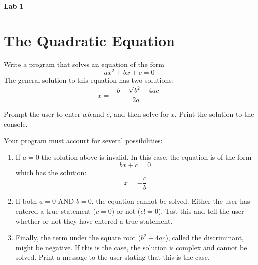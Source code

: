 \documentclass{article}
\begin{document}
\fancyfoot[C]{\thepage}
\vspace*{0cm}
\begin{center}
	{\LARGE \textbf{Lab 1}}\\
	\vspace{0.25cm}
\end{center}

\section{The Quadratic Equation}
Write a program that solves an equation of the form 
\begin{equation*}
ax^2+bx+c=0
\end{equation*}
The general solution to this equation has two solutions:
\begin{equation*}
x=\frac{-b\pm\sqrt{b^2-4ac}}{2a}
\end{equation*}

Prompt the user to enter $a$,$b$,and $c$, and then solve for $x$. Print the solution to the console.

Your program must account for several possibilities:
\begin{enumerate}
	\item If $a=0$ the solution above is invalid. In this case, the equation is of the form 
	\begin{equation*}
	bx+c=0
	\end{equation*}
	which has the solution:
	\begin{equation*}
	x=-\frac{c}{b}
	\end{equation*}
	
	\item If both $a=0$ AND $b=0$, the equation cannot be solved. Either the user has entered a true statement ($c=0$) or not ($c!=0$). Test this and tell the user whether or not they have entered a true statement.
	
	\item Finally, the term under the square root ($b^2-4ac$), called the discriminant, might be negative. If this is the case, the solution is complex and cannot be solved. Print a message to the user stating that this is the case.
\end{enumerate}
\end{document}
